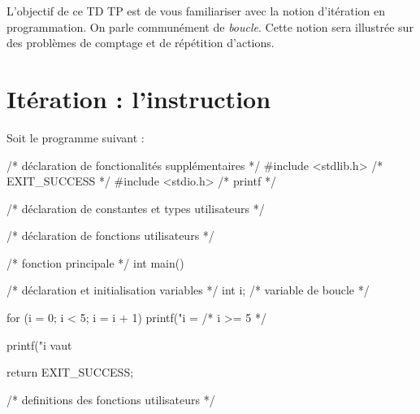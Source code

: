 
\newcommand{\commentaire}[1]{}


\vspace{-0.5cm}
L'objectif de ce TD TP est de vous familiariser avec la notion
d'itération en programmation. On parle communément de
\emph{boucle}. Cette notion sera illustrée sur des problèmes de comptage
et de répétition d'actions.


\section{Itération : l'instruction }


Soit le programme suivant :
{\small
\begin{listing}{1}
/* déclaration de fonctionalités supplémentaires */
#include <stdlib.h> /* EXIT_SUCCESS */
#include <stdio.h> /* printf */

/* déclaration de constantes et types utilisateurs */

/* déclaration de fonctions utilisateurs */

/* fonction principale */
int main()
{
    /* déclaration et initialisation variables */
    int i; /* variable de boucle */

    for (i = 0; i < 5; i = i + 1)
    {
        printf("i = %
    }
    /* i >= 5 */

    printf("i vaut %

    return EXIT_SUCCESS;
}

/* definitions des fonctions utilisateurs */
\end{listing}
}


